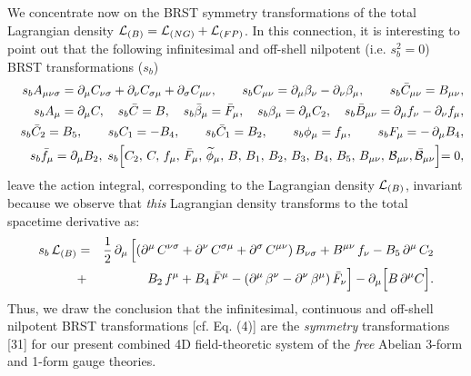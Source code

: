 \documentclass[12pt]{article}
\begin{document}
We concentrate now on the BRST symmetry transformations of the total Lagrangian density ${\cal L}_{(B)} = {\cal L}_{(NG)} + {\cal L}_{(FP)}$. 
In this connection, it is interesting
to point out that the following infinitesimal and off-shell nilpotent (i.e. $s_{b}^2 = 0 $) BRST transformations ($s_{b}$)
\begin{eqnarray}\label{4}
&&s_b A_{\mu\nu\sigma} = \partial_\mu C_{\nu\sigma} + \partial_\nu C_{\sigma\mu}
+ \partial_\sigma C_{\mu\nu}, \qquad  s_b C_{\mu\nu} = \partial_\mu \beta_\nu
- \partial_\nu \beta_\mu, \qquad s_b \bar C_{\mu\nu} = B_{\mu\nu}, \nonumber\\
&&s_b A_{\mu} = \partial_\mu C, \quad s_b \bar C = B, \quad  
s_b \bar \beta_\mu = \bar F_\mu, \quad
s_b \beta_\mu = \partial_\mu C_2,  \quad s_b \bar B_{\mu\nu} = \partial_\mu f_\nu - \partial_\nu f_\mu, \nonumber\\
&&s_b {\bar C}_2 = B_5, \qquad s_b C_1 = - B_4, \qquad  s_b \bar C_1 = B_2, \qquad s_b \phi_\mu = f_\mu, \qquad s_b F_\mu = -\, \partial_\mu B_4,
\nonumber\\
&& s_b \bar f_\mu = \partial_\mu B_2, \; s_b  \Bigl [ C_2,\, C,\, f_\mu,\, {\bar F}_\mu,\,\widetilde \phi_\mu, \, B,\, B_1, \, B_2,\, B_3, \,  B_4,\, B_5,\,
 B_{\mu\nu}, \, {\cal B_{\mu\nu}}, \bar {\cal B}_{\mu\nu}
\Bigl ] = 0,
\end{eqnarray}
leave the action integral, corresponding to the Lagrangian density ${\cal L}_{(B)}$, invariant because we observe that
{\it this} Lagrangian density transforms to the total spacetime derivative as: 
\begin{eqnarray}\label{5}
s_b\, {\cal L}_{(B)} &=& \dfrac{1}{2}\, \partial_\mu\, \Big[ (\partial^\mu\, C^{\nu\sigma} + \partial^\nu\, C^{\sigma\mu}
+ \partial^\sigma\, C^{\mu\nu}) \, B_{\nu\sigma}  + B^{\mu\nu}\, f_\nu - B_5\, \partial^\mu\, C_2  \nonumber\\
&+& B_2\, f^\mu + B_4\, \bar F^\mu - (\partial^\mu\,  \beta^\nu - \partial^\nu\, \beta^\mu)\,  \bar F_\nu \Big] 
- \partial_\mu \Big [B \, \partial^\mu  C \Big ].
\end{eqnarray}
Thus, we draw the conclusion that the infinitesimal, continuous and off-shell nilpotent BRST transformations [cf. Eq. (4)] are the {\it symmetry}
transformations [31] for our present combined 4D field-theoretic system  of the {\it free} Abelian 3-form and 1-form gauge theories. 
\end{document}
